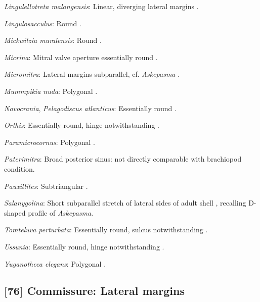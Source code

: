 \documentclass[openany]{book}
\begin{document}
\hypertarget{Lingulellotreta_malongensis-coding-75}{}
\emph{Lingulellotreta malongensis}: Linear, diverging lateral margins
\citep{Zhang2007Noteon}.

\hypertarget{Lingulosacculus-coding-75}{}
\emph{Lingulosacculus}: Round \citep{Balthasar2009EarlyCambrian}.

\hypertarget{Mickwitzia_muralensis-coding-75}{}
\emph{Mickwitzia muralensis}: Round \citep{Balthasar2004Shellstructure}.

\hypertarget{Micrina-coding-75}{}
\emph{Micrina}: Mitral valve aperture essentially round
\citep{Holmer2008TheEarly}.

\hypertarget{Micromitra-coding-75}{}
\emph{Micromitra}: Lateral margins subparallel, cf. \emph{Askepasma}
\citep{Robson2001Cambrianand}.

\hypertarget{Mummpikia_nuda-coding-75}{}
\emph{Mummpikia nuda}: Polygonal \citep{Balthasar2008iMummpikia}.

\hypertarget{Novocrania-coding-75}{}
\emph{Novocrania}, \emph{Pelagodiscus atlanticus}: Essentially round
\citep{Williams2000LinguliformeaCraniiformea}.

\hypertarget{Orthis-coding-75}{}
\emph{Orthis}: Essentially round, hinge notwithstanding \citep[fig.
523]{Williams2000LinguliformeaCraniiformea}.

\hypertarget{Paramicrocornus-coding-75}{}
\emph{Paramicrocornus}: Polygonal \citep{Zhang2018Ahyolithid}.

\hypertarget{Paterimitra-coding-75}{}
\emph{Paterimitra}: Broad posterior sinus: not directly comparable with
brachiopod condition.

\hypertarget{Pauxillites-coding-75}{}
\emph{Pauxillites}: Subtriangular \citep{Malinky1987}.

\hypertarget{Salanygolina-coding-75}{}
\emph{Salanygolina}: Short subparallel stretch of lateral sides of adult
shell \citep[fig. 1a]{Holmer2009Theenigmatic}, recalling D-shaped
profile of \emph{Askepasma}.

\hypertarget{Tomteluva_perturbata-coding-75}{}
\emph{Tomteluva perturbata}: Essentially round, sulcus notwithstanding
\citep{Streng2016Anew}.

\hypertarget{Ussunia-coding-75}{}
\emph{Ussunia}: Essentially round, hinge notwithstanding
\citep{Williams2000LinguliformeaCraniiformea}.

\hypertarget{Yuganotheca_elegans-coding-75}{}
\emph{Yuganotheca elegans}: Polygonal \citep{Zhang2014Anearly}.

\subsection*{{[}76{]} Commissure: Lateral
margins}\label{commissure-lateral-margins}
\end{document}
